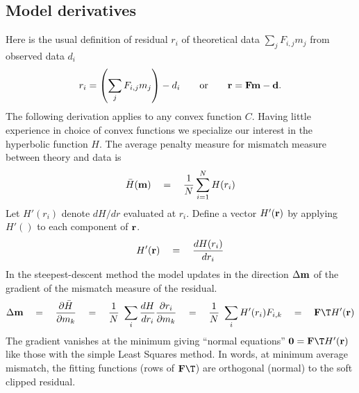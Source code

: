 \subsection{Model derivatives}
Here is the usual definition of residual $r_i$
of theoretical data $\sum_j F_{i,j} m_j$ from observed data $d_i$
\begin{equation}
r_i = \left(\sum_j F_{i,j} m_j\right) - d_i
\quad\quad {\rm or}\quad\quad
 \bold r = \bold F \bold m - \bold d.
\end{equation}
The following derivation applies to any convex function $C$.
Having little experience in choice of convex functions we specialize
our interest in the hyperbolic function $H$.
The average penalty measure for mismatch measure between theory and data is
\begin{equation}
\bar H(\bold m)
\quad=\quad
\frac{1}{N} \sum_{i=1}^N H(r_i)
\end{equation}
Let $H'(r_i)$ denote $dH/dr$ evaluated at $r_i$.
Define a vector $H'(\bold r)$ by applying $H'()$ to each component of $\bold r$.
\begin{equation}
H'(\bold r)
\quad=\quad
 \frac{d H(r_i)}{d r_i}
\end{equation}
In the steepest-descent method the model updates
in the direction
$\Delta \bold m$
of the gradient of the mismatch measure of the residual.
\begin{equation}
\Delta\bold m
\quad=\quad
\frac{\partial \bar H}{ \partial m_k}
\quad=\quad
\frac{1}{N} \
\sum_i \frac{d H}{d r_i}
       \frac{\partial r_i}{ \partial m_k}
\quad=\quad
\frac{1}{N} \
	\sum_i H'(r_i) F_{i,k}
\quad=\quad
	\bold F\T H'(\bold r)
\end{equation}
The gradient vanishes at the minimum giving ``normal equations''
$\bold 0 =  \bold F\T H'(\bold r)$ like those with the simple Least Squares method.
In words, at minimum average mismatch, the fitting functions (rows of $ \bold F\T $)
are orthogonal (normal) to the soft clipped residual.

